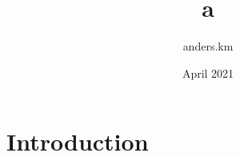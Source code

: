 \documentclass{article}
\title{a}
\author{anders.km }
\date{April 2021}
\begin{document}
\maketitle

\section{Introduction}
\end{document}
